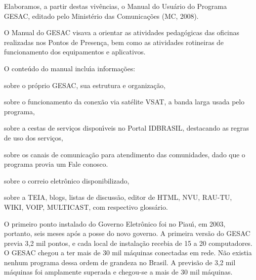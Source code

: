 \documentclass[
12pt,		%
openright,	%
twoside,  %
a4paper,			%
chapter=TITLE,		%
english,			%
french,				%
spanish,			%
brazil				%
]{USPSC-classe/USPSC}
\begin{document}
Elaboramos, a partir destas viv\^encias, o Manual do Usu\'ario do Programa GESAC, editado pelo Minist\'erio das Comunica\c{c}\~oes (MC, 2008).









O Manual do GESAC visava a orientar as atividades pedag\'ogicas das oficinas realizadas nos Pontos de Presen\c{c}a, bem como as  atividades rotineiras de funcionamento dos equipamentos e aplicativos.









O conte\'udo do manual inclu\'{\i}a informa\c{c}\~oes:










\begin{alineas}
\item sobre o pr\'oprio GESAC, sua estrutura e organiza\c{c}\~ao,
\item sobre o funcionamento da conex\~ao via sat\'elite VSAT, a banda larga usada pelo programa,
\item sobre a cestas de servi\c{c}os dispon\'{\i}veis no Portal IDBRASIL, destacando as regras de uso dos servi\c{c}os,
\item sobre os canais de comunica\c{c}\~ao para atendimento das comunidades, dado que o programa provia um \textquotedbl Fale conosco\textquotedbl .
\item sobre o correio eletr\^onico disponibilizado,
\item sobre a TEIA, blogs, listas de discuss\~ao, editor de HTML, NVU, RAU-TU, WIKI, VOIP, MULTICAST, com respectivo gloss\'ario.
\end{alineas}

O primeiro ponto instalado do Governo Eletr\^onico foi no Piau\'{\i}, em 2003, portanto, seis meses ap\'os a posse do novo governo. A primeira vers\~ao do GESAC previa 3,2 mil pontos, e cada local de instala\c{c}\~ao recebia de 15 a 20 computadores. O GESAC chegou a ter mais de 30 mil m\'aquinas conectadas em rede. N\~ao existia nenhum programa dessa ordem de grandeza no Brasil. A previs\~ao de 3,2 mil m\'aquinas foi amplamente superada e chegou-se a mais de 30 mil m\'aquinas.
\end{document}
